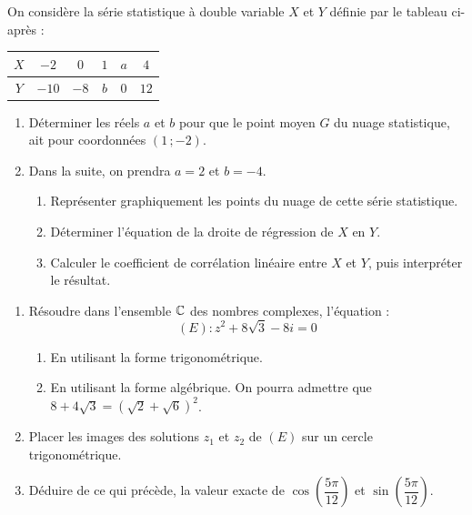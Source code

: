 \documentclass[11pt]{article}
\begin{document}


On considère la série statistique à double variable $X$ et $Y$ définie par le tableau ci-après :

\begin{center}
\renewcommand{\arraystretch}{1.3}
\begin{tabular}{|c|c|c|c|c|c|}
\hline
$X$ & $-2$ & $0$ & $1$ & $a$ & $4$ \\
\hline
$Y$ & $-10$ & $-8$ & $b$ & $0$ & $12$ \\
\hline
\end{tabular}
\end{center}

\begin{enumerate}
  \item Déterminer les réels $a$ et $b$ pour que le point moyen $G$ du nuage statistique, ait pour coordonnées $(1\,;-2)$.
  \item Dans la suite, on prendra $a = 2$ et $b = -4$.
  \begin{enumerate}[label=\alph*.]
    \item Représenter graphiquement les points du nuage de cette série statistique.
    \item Déterminer l'équation de la droite de régression de $X$ en $Y$.
    \item Calculer le coefficient de corrélation linéaire entre $X$ et $Y$, puis interpréter le résultat.
  \end{enumerate}
\end{enumerate}


\begin{enumerate}
  \item Résoudre dans l'ensemble $\mathbb{C}$ des nombres complexes, l'équation :
  \[ (E) : z^2 + 8\sqrt{3} - 8i = 0 \]
  \begin{enumerate}[label=\alph*.]
    \item En utilisant la forme trigonométrique.
    \item En utilisant la forme algébrique. On pourra admettre que $8 + 4\sqrt{3} = \left(\sqrt{2} + \sqrt{6}\right)^2$.
  \end{enumerate}
  \item Placer les images des solutions $z_1$ et $z_2$ de $(E)$ sur un cercle trigonométrique.
  \item Déduire de ce qui précède, la valeur exacte de $\cos\!\left(\dfrac{5\pi}{12}\right)$ et $\sin\!\left(\dfrac{5\pi}{12}\right)$.
\end{enumerate}
\end{document}
